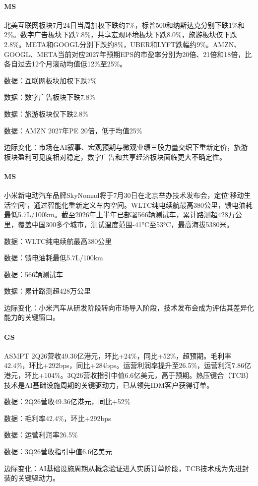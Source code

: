 \documentclass[11pt]{ctexart}
\begin{document}
\paragraph{MS} 北美互联网板块7月24日当周加权下跌约7\%，标普500和纳斯达克分别下跌1\%和2\%。数字广告板块下跌7.8\%，共享宏观环境板块下跌8.0\%，旅游板块仅下跌2.8\%。META和GOOGL分别下跌约8\%，UBER和LYFT跌幅约9\%。AMZN、GOOGL、META当前对应2027年预期EPS的市盈率分别为20倍、21倍和18倍，比各自过去12个月滚动均值低12\%至25\%。
{\small\color{refgray}数据：互联网板块加权下跌7\%\par}
{\small\color{refgray}数据：数字广告板块下跌7.8\%\par}
{\small\color{refgray}数据：旅游板块仅下跌2.8\%\par}
{\small\color{refgray}数据：AMZN 2027年PE 20倍，低于均值25\%\par}
{\small\color{refgray}边际变化：市场在AI叙事、宏观预期与微观业绩三股力量交织下重新定价，旅游板块盈利可见度相对稳定，数字广告和共享经济板块面临更大不确定性。\par}
\paragraph{MS} 小米新电动汽车品牌SkyNomad将于7月30日在北京举办技术发布会，定位‘移动生活空间’，通过智能化重新定义车内空间。WLTC纯电续航最高380公里，馈电油耗最低5.7L/100km。截至2026年上半年已部署566辆测试车，累计路测超428万公里，覆盖中国300多个城市，测试温度范围-41°C至53°C，最高海拔5380米。
{\small\color{refgray}数据：WLTC纯电续航最高380公里\par}
{\small\color{refgray}数据：馈电油耗最低5.7L/100km\par}
{\small\color{refgray}数据：566辆测试车\par}
{\small\color{refgray}数据：累计路测超428万公里\par}
{\small\color{refgray}边际变化：小米汽车从研发阶段转向市场导入阶段，技术发布会成为评估其差异化能力的关键窗口。\par}
\paragraph{GS} ASMPT 2Q26营收49.36亿港元，环比+24\%，同比+52\%，超预期。毛利率42.4\%，环比+292bps，同比+284bps。运营利润率提升至26.5\%，运营利润7.86亿港元，环比+104\%。3Q26营收指引中值6.6亿美元，高于预期。热压键合（TCB）技术是AI基础设施周期的关键驱动力，已从领先IDM客户获得订单。
{\small\color{refgray}数据：2Q26营收49.36亿港元，同比+52\%\par}
{\small\color{refgray}数据：毛利率42.4\%，环比+292bps\par}
{\small\color{refgray}数据：运营利润率26.5\%\par}
{\small\color{refgray}数据：3Q26营收指引中值6.6亿美元\par}
{\small\color{refgray}边际变化：AI基础设施周期从概念验证进入实质订单阶段，TCB技术成为先进封装的关键驱动力。\par}
\end{document}
